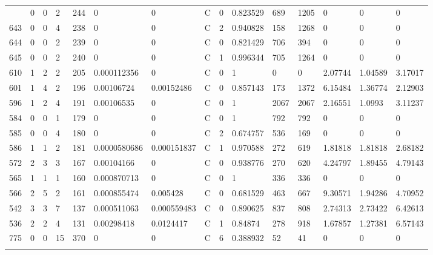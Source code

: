 \begin{latin}
\begin{longtable}{lllllllllllllll}
\begin{comment}
	649 & 0  & 0   & 2  & 244 & 0              & 0              & C & 0  & 0.823529 & 689  & 1205 & 0       & 0       & 0       \\
	643 & 0  & 0   & 4  & 238 & 0              & 0              & C & 2  & 0.940828 & 158  & 1268 & 0       & 0       & 0       \\
	644 & 0  & 0   & 2  & 239 & 0              & 0              & C & 0  & 0.821429 & 706  & 394  & 0       & 0       & 0       \\
	645 & 0  & 0   & 2  & 240 & 0              & 0              & C & 1  & 0.996344 & 705  & 1264 & 0       & 0       & 0       \\
	610 & 1  & 2   & 2  & 205 & 0.000112356    & 0              & C & 0  & 1        & 0    & 0    & 2.07744 & 1.04589 & 3.17017 \\
	601 & 1  & 4   & 2  & 196 & 0.00106724     & 0.00152486     & C & 0  & 0.857143 & 173  & 1372 & 6.15484 & 1.36774 & 2.12903 \\
	596 & 1  & 2   & 4  & 191 & 0.00106535     & 0              & C & 0  & 1        & 2067 & 2067 & 2.16551 & 1.0993  & 3.11237 \\
	584 & 0  & 0   & 1  & 179 & 0              & 0              & C & 0  & 1        & 792  & 792  & 0       & 0       & 0       \\
	585 & 0  & 0   & 4  & 180 & 0              & 0              & C & 2  & 0.674757 & 536  & 169  & 0       & 0       & 0       \\
	586 & 1  & 1   & 2  & 181 & 0.0000580686   & 0.000151837    & C & 1  & 0.970588 & 272  & 619  & 1.81818 & 1.81818 & 2.68182 \\
	572 & 2  & 3   & 3  & 167 & 0.00104166     & 0              & C & 0  & 0.938776 & 270  & 620  & 4.24797 & 1.89455 & 4.79143 \\
	565 & 1  & 1   & 1  & 160 & 0.000870713    & 0              & C & 0  & 1        & 336  & 336  & 0       & 0       & 0       \\
	566 & 2  & 5   & 2  & 161 & 0.000855474    & 0.005428       & C & 0  & 0.681529 & 463  & 667  & 9.30571 & 1.94286 & 4.70952 \\
	542 & 3  & 3   & 7  & 137 & 0.000511063    & 0.000559483    & C & 0  & 0.890625 & 837  & 808  & 2.74313 & 2.73422 & 6.42613 \\
	536 & 2  & 2   & 4  & 131 & 0.00298418     & 0.0124417      & C & 1  & 0.84874  & 278  & 918  & 1.67857 & 1.27381 & 6.57143 \\
	775 & 0  & 0   & 15 & 370 & 0              & 0              & C & 6  & 0.388932 & 52   & 41   & 0       & 0       & 0       \\

\end{comment}
\end{longtable}
\end{latin}

